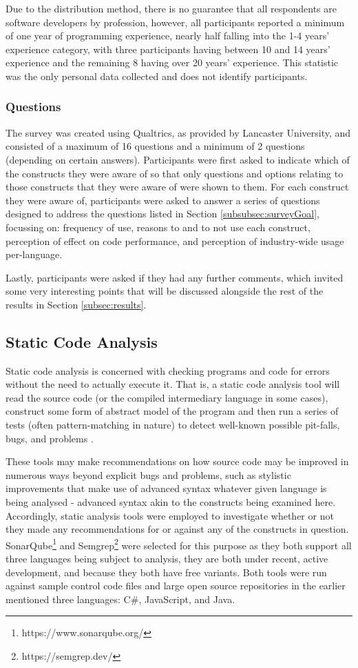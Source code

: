 \documentclass{article}
\begin{document}
            Due to the distribution method, there is no guarantee that all respondents are software developers by profession, however, all participants reported a minimum of one year of programming experience, nearly half falling into the 1-4 years' experience category, with three participants having between 10 and 14 years' experience and the remaining 8 having over 20 years' experience. This statistic was the only personal data collected and does not identify participants.

        \subsubsection{Questions}
            The survey was created using Qualtrics, as provided by Lancaster University, and consisted of a maximum of 16 questions and a minimum of 2 questions (depending on certain answers).
            Participants were first asked to indicate which of the constructs they were aware of so that only questions and options relating to those constructs that they were aware of were shown to them. For each construct they were aware of, participants were asked to answer a series of questions designed to address the questions listed in Section \ref{subsubsec:surveyGoal}, focussing on: frequency of use, reasons to and to not use each construct, perception of effect on code performance, and perception of industry-wide usage per-language.
            
            Lastly, participants were asked if they had any further comments, which invited some very interesting points that will be discussed alongside the rest of the results in Section \ref{subsec:results}.

    \subsection{Static Code Analysis}
        Static code analysis is concerned with checking programs and code for errors without the need to actually execute it. That is, a static code analysis tool will read the source code (or the compiled intermediary language in some cases), construct some form of abstract model of the program and then run a series of tests (often pattern-matching in nature) to detect well-known possible pit-falls, bugs, and problems \citep{staticCodeAnalysis}.

        These tools may make recommendations on how source code may be improved in numerous ways beyond explicit bugs and problems, such as stylistic improvements that make use of advanced syntax whatever given language is being analysed - advanced syntax akin to the constructs being examined here. Accordingly, static analysis tools were employed to investigate whether or not they made any recommendations for or against any of the constructs in question. SonarQube\footnote{https://www.sonarqube.org/} and Semgrep\footnote{https://semgrep.dev/} were selected for this purpose as they both support all three languages being subject to analysis, they are both under recent, active development, and because they both have free variants. Both tools were run against sample control code files and large open source repositories in the earlier mentioned three languages: C\#, JavaScript, and Java.
            
\end{document}
